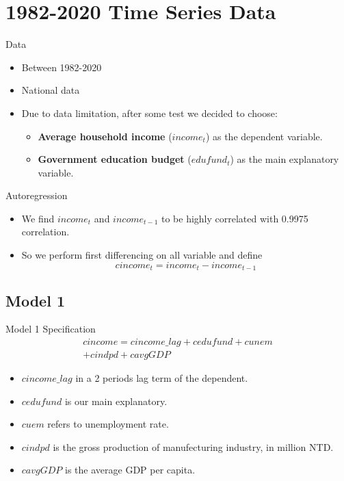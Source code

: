 \documentclass[compress]{beamer}
\begin{document}
\section[Time Series]{1982-2020 Time Series Data}
\begin{frame}{Data}
  \begin{itemize}
    \item Between 1982-2020
    \item National data
    \item Due to data limitation, after some test we decided to choose:
    \begin{itemize}
      \item \textbf{Average household income} ($income_t$) as the dependent variable.
      \item \textbf{Government education budget} ($edufund_t$) as the main explanatory variable.
    \end{itemize}
  \end{itemize}
\end{frame}

\begin{frame}{Autoregression}
  \begin{itemize}
    \item We find $income_t$ and $income_{t-1}$ to be highly correlated with 0.9975 correlation.
    \item So we perform first differencing on all variable and define
    \begin{equation}
      cincome_t = income_t - income_{t-1}
    \end{equation}
  \end{itemize}
\end{frame}

\subsection{Model 1}

\begin{frame}{Model 1 Specification}
  \begin{multline}
    cincome = cincome\_lag + cedufund + cunem \\ + cindpd + cavgGDP
  \end{multline}
  \begin{itemize}
    \item $cincome\_lag$ in a 2 periods lag term of the dependent.
    \item $cedufund$ is our main explanatory.
    \item $cuem$ refers to unemployment rate.
    \item $cindpd$ is the gross production of manufecturing industry, in million NTD.
    \item $cavgGDP$ is the average GDP per capita.
  \end{itemize}
\end{frame}
\end{document}
